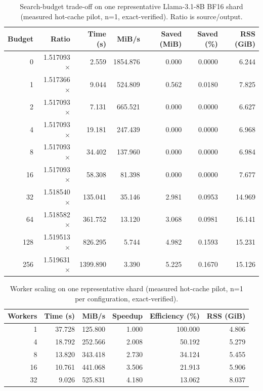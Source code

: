
\begin{table}[t]
\centering
\scriptsize
\begin{tabular}{rrrrrrr}
\toprule
Budget & Ratio & Time (s) & MiB/s & Saved (MiB) & Saved (\%) & RSS (GiB) \\
\midrule
0 & 1.517093$\times$ & 2.559 & 1854.876 & 0.000 & 0.0000 & 6.244 \\
1 & 1.517366$\times$ & 9.044 & 524.809 & 0.562 & 0.0180 & 7.825 \\
2 & 1.517093$\times$ & 7.131 & 665.521 & 0.000 & 0.0000 & 6.627 \\
4 & 1.517093$\times$ & 19.181 & 247.439 & 0.000 & 0.0000 & 6.968 \\
8 & 1.517093$\times$ & 34.402 & 137.960 & 0.000 & 0.0000 & 6.984 \\
16 & 1.517093$\times$ & 58.308 & 81.398 & 0.000 & 0.0000 & 7.677 \\
32 & 1.518540$\times$ & 135.041 & 35.146 & 2.981 & 0.0953 & 14.969 \\
64 & 1.518582$\times$ & 361.752 & 13.120 & 3.068 & 0.0981 & 16.141 \\
128 & 1.519513$\times$ & 826.295 & 5.744 & 4.982 & 0.1593 & 15.231 \\
256 & 1.519631$\times$ & 1399.890 & 3.390 & 5.225 & 0.1670 & 15.126 \\
\bottomrule
\end{tabular}
\caption{Search-budget trade-off on one representative Llama-3.1-8B BF16 shard (measured hot-cache pilot, n=1, exact-verified). Ratio is source/output.}
\label{tab:brevis-budget-pilot}
\end{table}

\begin{table}[t]
\centering
\scriptsize
\begin{tabular}{rrrrrr}
\toprule
Workers & Time (s) & MiB/s & Speedup & Efficiency (\%) & RSS (GiB) \\
\midrule
1 & 37.728 & 125.800 & 1.000 & 100.000 & 4.806 \\
4 & 18.792 & 252.566 & 2.008 & 50.192 & 5.279 \\
8 & 13.820 & 343.418 & 2.730 & 34.124 & 5.455 \\
16 & 10.761 & 441.068 & 3.506 & 21.913 & 5.906 \\
32 & 9.026 & 525.831 & 4.180 & 13.062 & 8.037 \\
\bottomrule
\end{tabular}
\caption{Worker scaling on one representative shard (measured hot-cache pilot, n=1 per configuration, exact-verified).}
\label{tab:brevis-worker-pilot}
\end{table}

